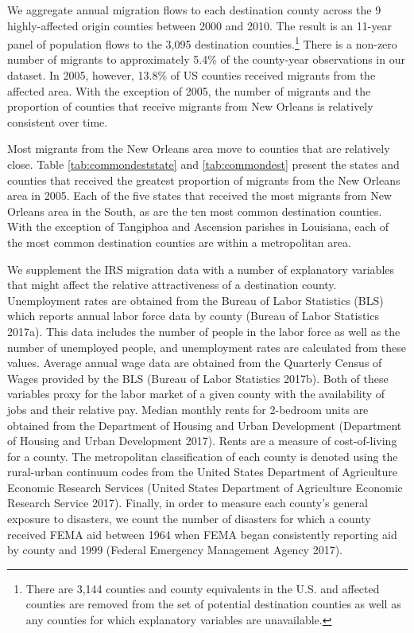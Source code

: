\documentclass[]{article}
\begin{document}
We aggregate annual migration flows to each destination county across
the 9 highly-affected origin counties between 2000 and 2010. The result
is an 11-year panel of population flows to the 3,095 destination
counties.\footnote{There are 3,144 counties and county equivalents in
  the U.S. and affected counties are removed from the set of potential
  destination counties as well as any counties for which explanatory
  variables are unavailable.} There is a non-zero number of migrants to
approximately 5.4\% of the county-year observations in our dataset. In
2005, however, 13.8\% of US counties received migrants from the affected
area. With the exception of 2005, the number of migrants and the
proportion of counties that receive migrants from New Orleans is
relatively consistent over time.

Most migrants from the New Orleans area move to counties that are
relatively close. Table \ref{tab:commondeststate} and
\ref{tab:commondest} present the states and counties that received the
greatest proportion of migrants from the New Orleans area in 2005. Each
of the five states that received the most migrants from New Orleans area
in the South, as are the ten most common destination counties. With the
exception of Tangiphoa and Ascension parishes in Louisiana, each of the
most common destination counties are within a metropolitan area.

We supplement the IRS migration data with a number of explanatory
variables that might affect the relative attractiveness of a destination
county. Unemployment rates are obtained from the Bureau of Labor
Statistics (BLS) which reports annual labor force data by county (Bureau
of Labor Statistics 2017a). This data includes the number of people in
the labor force as well as the number of unemployed people, and
unemployment rates are calculated from these values. Average annual wage
data are obtained from the Quarterly Census of Wages provided by the BLS
(Bureau of Labor Statistics 2017b). Both of these variables proxy for
the labor market of a given county with the availability of jobs and
their relative pay. Median monthly rents for 2-bedroom units are
obtained from the Department of Housing and Urban Development
(Department of Housing and Urban Development 2017). Rents are a measure
of cost-of-living for a county. The metropolitan classification of each
county is denoted using the rural-urban continuum codes from the United
States Department of Agriculture Economic Research Services (United
States Department of Agriculture Economic Research Service 2017).
Finally, in order to measure each county's general exposure to
disasters, we count the number of disasters for which a county received
FEMA aid between 1964 when FEMA began consistently reporting aid by
county and 1999 (Federal Emergency Management Agency 2017).
\end{document}
